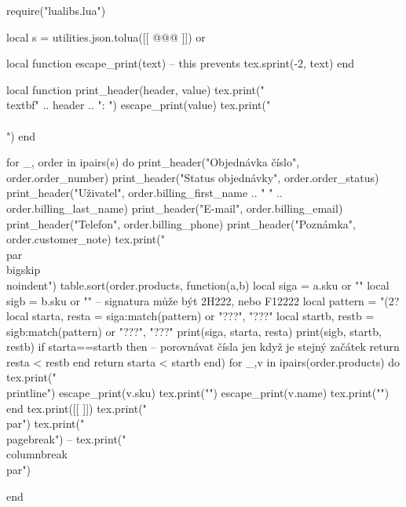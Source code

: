 \documentclass[landscape,a4page]{article}
\begin{document}
\columnseprule=0.3pt
\columnsep=20pt
\parindent=0pt
\parskip=2pt
\newcommand\printline[2]{\parbox{.2\linewidth}{#1}~\parbox{.7\linewidth}{#2}\\}

\begin{multicols*}{3}
  \sloppy

\begin{luacode*}
require("lualibs.lua")

local s =  utilities.json.tolua([[
@@@
]]) or {}



local function escape_print(text)
  -- this prevents
  tex.sprint(-2, text)
end

local function print_header(header, value)
  tex.print("\\textbf{" .. header .. ":} ")
  escape_print(value)
  tex.print("\\\\")
end


for _, order in ipairs(s) do
  print_header("Objednávka číslo", order.order_number)
  print_header("Status objednávky", order.order_status)
  print_header("Uživatel", order.billing_first_name .. " " .. order.billing_last_name)
  print_header("E-mail", order.billing_email)
  print_header("Telefon", order.billing_phone)
  print_header("Poznámka", order.customer_note)
  tex.print("\\par\\bigskip\\noindent")
  table.sort(order.products, function(a,b)
    local siga = a.sku or ""
    local sigb = b.sku or ""
    -- signatura může být 2H222, nebo F12222
    local pattern = "(2?%
    local starta, resta = siga:match(pattern) or "???", "???"
    local startb, restb = sigb:match(pattern) or "???", "???"
    print(siga, starta, resta)
    print(sigb, startb, restb)
    if starta==startb then
      -- porovnávat čísla jen když je stejný začátek
      return resta < restb 
    end
    return starta < startb
  end)
  for _,v in ipairs(order.products) do
    tex.print("\\printline{")
    escape_print(v.sku)
    tex.print("}{")
    escape_print(v.name)
  tex.print("}")
  end
  tex.print([[
  \vfill
  \null
  ]])
  tex.print("\\par")
  tex.print("\\pagebreak")
  -- tex.print("\\columnbreak\\par")


end



\end{luacode*}
\end{multicols*}
\end{document}
